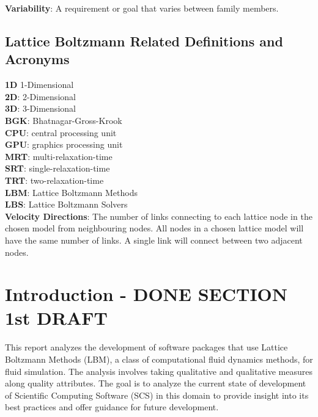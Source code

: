\documentclass[12pt, notitlepage]{article}
\begin{document}
\begin{singlespace}
\noindent\textbf{Variability}: A requirement or goal that varies between family members.

\newpage
\subsection{Lattice Boltzmann Related Definitions and Acronyms}

\noindent\textbf{1D} 1-Dimensional\\

\noindent\textbf{2D}: 2-Dimensional\\

\noindent\textbf{3D}: 3-Dimensional\\

\noindent\textbf{BGK}: Bhatnagar-Gross-Krook\\

\noindent\textbf{CPU}: central processing unit\\

\noindent\textbf{GPU}: graphics processing unit\\

\noindent\textbf{MRT}: multi-relaxation-time\\

\noindent\textbf{SRT}: single-relaxation-time\\

\noindent\textbf{TRT}: two-relaxation-time\\

\noindent\textbf{LBM}: Lattice Boltzmann Methods\\

\noindent\textbf{LBS}: Lattice Boltzmann Solvers\\

\noindent\textbf{Velocity Directions}: The number of links connecting to each lattice node in the chosen model from neighbouring nodes. All nodes in a chosen lattice model will have the same number of links. A single link will connect between two adjacent nodes.


\end{singlespace}
\newpage
\section{Introduction - DONE SECTION 1st DRAFT}

This report analyzes the development of software packages that use Lattice Boltzmann Methods (LBM), a class of computational fluid dynamics methods, for fluid simulation. The analysis involves taking qualitative and qualitative measures along quality attributes. The goal is to analyze the current state of development of Scientific Computing Software (SCS) in this domain to provide insight into its best practices and offer guidance for future development. 
\end{document}
